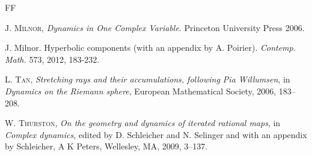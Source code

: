 \documentclass[a4paper,reqno,times, 11pt]{amsart}
\theoremstyle{remark}
\theoremstyle{plain}
\numberwithin{equation}{section}
\begin{document}
\begin{thebibliography}{FF}
	
	\textsc{J. Milnor,}
	{\it Dynamics in One Complex Variable}. Princeton University Press 2006.
	
	
	 J. Milnor. Hyperbolic components (with an appendix by A. Poirier). {\it Contemp. Math.} 573, 2012, 183-232.
	
	\textsc{L. Tan},
	\textit{Stretching rays and their accumulations, following Pia Willumsen}, in
	\textit{Dynamics on the Riemann sphere}, European Mathematical Society, 2006, 183--208.
	
	\textsc{W. Thurston,}
	\textit{On the geometry and dynamics of iterated rational maps},
	in
	\textit{Complex dynamics},
	{edited by D. Schleicher and N. Selinger and with an
		appendix by Schleicher},
	A K Peters, Wellesley, MA,
	2009,
	3--137.
\end{thebibliography}



\end{document}
